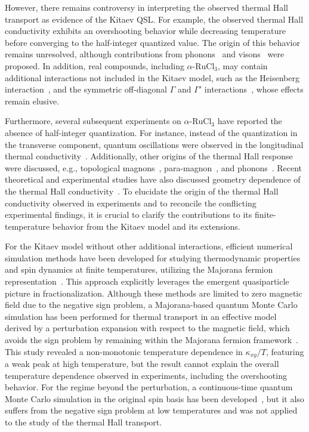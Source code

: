 \documentclass[twocolumn,superscriptaddress,showpacs, longbibliography, aps, prx]{revtex4-2}
\begin{document}
However, there remains controversy in interpreting the observed thermal Hall transport as evidence of the Kitaev QSL. 
For example, the observed thermal Hall conductivity exhibits an overshooting behavior while decreasing temperature before converging to the half-integer quantized value. 
The origin of this behavior remains unresolved, although contributions from phonons~\cite{Ye2018Quantization,Vinkler2018} and visons~\cite{Joy2022} were proposed. 
In addition, real compounds, including $\alpha$-$\mathrm{RuCl_3}$, may contain additional interactions not included in the Kitaev model, such as the Heisenberg interaction~\cite{Chaloupka_PRL2010,Chaloupka_PRL2013}, and the symmetric off-diagonal $\Gamma$ and $\Gamma'$ interactions~\cite{Rau2014,Rau2014pre,Winter2016}, whose effects remain elusive. 

Furthermore, several subsequent experiments on $\alpha$-$\mathrm{RuCl_3}$ have reported the absence of half-integer quantization. 
For instance, instead of the quantization in the transverse component, quantum oscillations were observed in the longitudinal thermal conductivity~\cite{Czajka_NPhy2021}. 
Additionally, other origins of the thermal Hall response were discussed, e.g., topological magnons~\cite{Czajka_NMat2023,ChernZK2021,ZhangCK2021, McClartyDGRPMP2018,Joshi2018}, para-magnon~\cite{Hentrich_PRB2019}, and phonons~\cite{Lefra_PRX2022, OhN2025}. 
Recent theoretical and experimental studies have also discussed geometry dependence of the thermal Hall conductivity~\cite{Halasz2025,ZhangHGJWTMY2025}.
To elucidate the origin of the thermal Hall conductivity observed in experiments and to reconcile the conflicting experimental findings, it is crucial to clarify the contributions to its finite-temperature behavior from the Kitaev model and its extensions.

For the Kitaev model without other additional interactions, efficient numerical simulation methods have been developed for studying thermodynamic properties and spin dynamics at finite temperatures, utilizing the Majorana fermion representation~\cite{NasuUM2014,NasuUM2015,YoshitakeNM2016,YoshitakeNKM2017,YoshitakeNM2017}. 
This approach explicitly leverages the emergent quasiparticle picture in fractionalization. 
Although these methods are limited to zero magnetic field due to the negative sign problem, a Majorana-based quantum Monte Carlo simulation has been performed for thermal transport in an effective model derived by a perturbation expansion with respect to the magnetic field, which avoids the sign problem by remaining within the Majorana fermion framework~\cite{NasuYM2017}. 
This study revealed a non-monotonic temperature dependence in $\kappa_{xy}/T$, featuring a weak peak at high temperature, but the result cannot explain the overall temperature dependence observed in experiments, including the overshooting behavior. 
For the regime beyond the perturbation, a continuous-time quantum Monte Carlo simulation in the original spin basis has been developed~\cite{YoshitakeNKM2020}, but it also suffers from the negative sign problem at low temperatures and was not applied to the study of the thermal Hall transport. 
\end{document}
